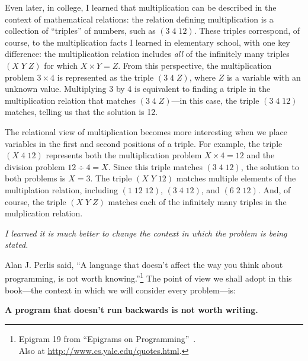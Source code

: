 

Even later, in college, I learned that multiplication can be
described in the context of mathematical relations: the relation
defining multiplication is a collection of ``triples'' of numbers,
such as \mbox{$(3\; 4\; 12)$}.
%
These triples correspond, of course, to the multiplication facts I
learned in elementary school, with one key difference: the
multiplication relation includes \emph{all} of the infinitely many
triples \mbox{$(X\; Y\; Z)$} for which \mbox{$X \times Y = Z$}.
%
From this perspective, the multiplication problem \mbox{$3 \times 4$}
is represented as the triple \mbox{$(3\; 4\; Z)$}, where $Z$ is a
variable with an unknown value.
%
Multiplying 3 by 4 is equivalent to finding a triple in the
multiplication relation that matches \mbox{$(3\; 4\; Z)$}---in this
case, the triple \mbox{$(3\; 4\; 12)$} matches, telling us that the
solution is 12.

The relational view of multiplication becomes more interesting when we
place variables in the first and second positions of a triple.
%
For example, the triple \mbox{$(X\; 4\; 12)$} represents both the
multiplication problem \mbox{$X \times 4 = 12$} and the division
problem \mbox{$12 \div 4 = X$}.
%
Since this triple matches \mbox{$(3\; 4\; 12)$}, the solution to both
problems is $X = 3$.
%
The triple \mbox{$(X\; Y\; 12)$} matches multiple elements of the
multiplation relation, including \mbox{$(1\; 12\; 12)$},
\mbox{$(3\; 4\; 12)$}, and \mbox{$(6\; 2\; 12)$}.
%
And, of course, the triple \mbox{$(X\; Y\; Z)$} matches each of the
infinitely many triples in the mulplication relation.




\emph{I learned it is much better to change the context in which the problem is being stated.}


Alan J. Perlis said, ``A language that doesn't affect the way you think about programming, is not worth knowing.''\footnote{Epigram 19 from ``Epigrams on Programming''~\cite{Perlis:1982:SFE:947955.1083808}.\\Also at \url{http://www.cs.yale.edu/quotes.html}.}
%
The point of view we shall adopt in this book---the context in which we will consider every problem---is:

\large
{\bf A program that doesn't run backwards is not worth writing.}
\normalsize
